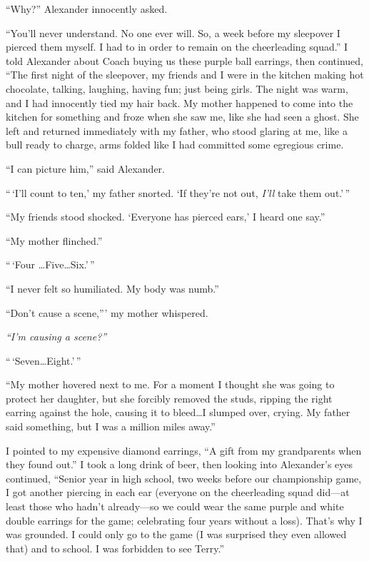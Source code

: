 ``Why?'' Alexander innocently asked.

``You'll never understand. No one ever will. So, a week before my
sleepover I pierced them myself. I had to in order to remain on the
cheerleading squad.'' I told Alexander about Coach buying us these
purple ball earrings, then continued, ``The first night of the
sleepover, my friends and I were in the kitchen making hot chocolate,
talking, laughing, having fun; just being girls. The night was warm, and
I had innocently tied my hair back. My mother happened to come into the
kitchen for something and froze when she saw me, like she had seen a
ghost. She left and returned immediately with my father, who stood
glaring at me, like a bull ready to charge, arms folded like I had
committed some egregious crime.

``I can picture him,'' said Alexander.

``\,`I'll count to ten,' my father snorted. `If they're not out,
\emph{I'll} take them out.'\,''

``My friends stood shocked. `Everyone has pierced ears,' I heard one
say.''

``My mother flinched.''

``\,`Four \ldots Five\ldots Six.'\,''

``I never felt so humiliated. My body was numb.''

``Don't cause a scene,''' my mother whispered.

\emph{``I'm causing a scene?''}

``\,`Seven\ldots Eight.'\,''

``My mother hovered next to me. For a moment I thought she was going to
protect her daughter, but she forcibly removed the studs, ripping the
right earring against the hole, causing it to bleed\ldots I slumped
over, crying. My father said something, but I was a million miles
away.''

I pointed to my expensive diamond earrings, ``A gift from my
grandparents when they found out.'' I took a long drink of beer, then
looking into Alexander's eyes continued, ``Senior year in high school,
two weeks before our championship game, I got another piercing in each
ear (everyone on the cheerleading squad did---at least those who hadn't
already---so we could wear the same purple and white double earrings for
the game; celebrating four years without a loss). That's why I was
grounded. I could only go to the game (I was surprised they even allowed
that) and to school. I was forbidden to see Terry.''

